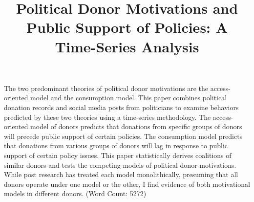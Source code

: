 \documentclass[12pt,]{article}
\title{Political Donor Motivations and Public Support of Policies: A
Time-Series Analysis  }
\author{}
\date{}
\renewenvironment{abstract}
 {{%
    \setlength{\leftmargin}{0mm}
    \setlength{\rightmargin}{\leftmargin}%
  }%
  \relax}
 {\endlist}
\begin{document}
%    


{%
\setlength{\parindent}{0pt}
\thispagestyle{plain}
{\fontsize{18}{20}\selectfont\raggedright 
\maketitle  %

}

{
   \vskip 13.5pt\relax \normalsize\fontsize{11}{12} 
 

}

}








\begin{abstract}

    \hbox{\vrule height .2pt width 39.14pc}

    \vskip 8.5pt %

\noindent The two predominant theories of political donor motivations
are the access-oriented model and the consumption model. This paper
combines political donation records and social media posts from
politicians to examine behaviors predicted by these two theories using a
time-series methodology. The access-oriented model of donors predicts
that donations from specific groups of donors will precede public
support of certain policies. The consumption model predicts that
donations from various groups of donors will lag in response to public
support of certain policy issues. This paper statistically derives
coalitions of similar donors and tests the competing models of political
donor motivations. While post research has treated each model
monolithically, presuming that all donors operate under one model or the
other, I find evidence of both motivational models in different donors.
(Word Count: 5272)


    \hbox{\vrule height .2pt width 39.14pc}


\end{abstract}


\vskip -8.5pt



\noindent \doublespacing 
\end{document}

